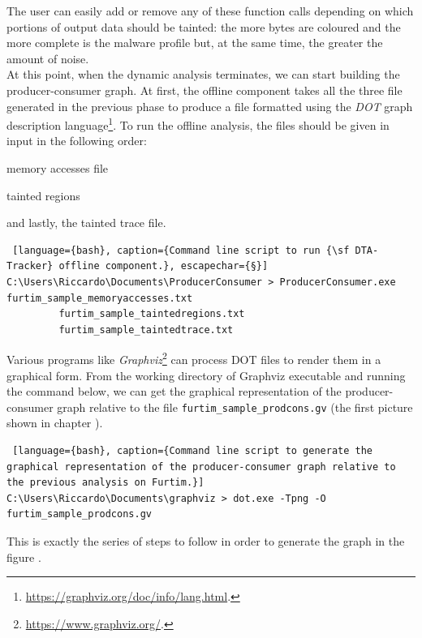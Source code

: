 \documentclass[LaM,binding=0.6cm]{sapthesis}
\begin{document}
The user can easily add or remove any of these function calls depending on which portions of output data should be tainted: the more bytes are coloured and the more complete is the malware profile but, at the same time, the greater the amount of noise.\\

At this point, when the dynamic analysis terminates, we can start building the producer-consumer graph. At first, the offline component takes all the three file generated in the previous phase to produce a file formatted using the \textit{DOT} graph description language\footnote{\url{https://graphviz.org/doc/info/lang.html}.}. To run the offline analysis, the files should be given in input in the following order:
\begin{enumerate*}[label=\roman*),itemjoin={,\quad}]
\item memory accesses file
\item tainted regions 
\item and lastly, the tainted trace file.\\
\end{enumerate*}
\begin{lstlisting} [language={bash}, caption={Command line script to run {\sf DTA-Tracker} offline component.}, escapechar={§}]
C:\Users\Riccardo\Documents\ProducerConsumer > ProducerConsumer.exe furtim_sample_memoryaccesses.txt 
		 furtim_sample_taintedregions.txt 
		 furtim_sample_taintedtrace.txt
\end{lstlisting}
Various programs like \textit{Graphviz}\footnote{\url{https://www.graphviz.org/}.} can process DOT files to render them in a graphical form. From the working directory of Graphviz executable and running the command below, we can get the graphical representation of the producer-consumer graph relative to the file \texttt{furtim\_sample\_prodcons.gv} (the first picture shown in chapter ).
\begin{lstlisting} [language={bash}, caption={Command line script to generate the graphical representation of the producer-consumer graph relative to the previous analysis on Furtim.}]
C:\Users\Riccardo\Documents\graphviz > dot.exe -Tpng -O furtim_sample_prodcons.gv
\end{lstlisting}
This is exactly the series of steps to follow in order to generate the graph in the figure .\\ 
\end{document}

